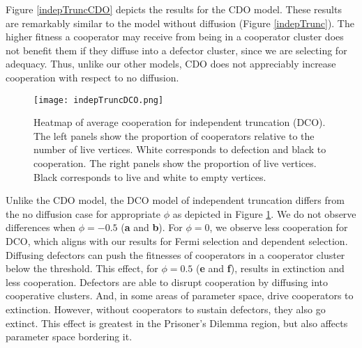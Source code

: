 \documentclass[reprint,aps,pre,twocolumn]{revtex4-1}
\begin{document}
Figure \ref{indepTruncCDO} depicts the results for the CDO model. These results are remarkably similar to the model without diffusion (Figure \ref{indepTrunc}). The higher fitness a cooperator may receive from being in a cooperator cluster does not benefit them if they diffuse into a defector cluster, since we are selecting for adequacy. Thus, unlike our other models, CDO does not appreciably increase cooperation with respect to no diffusion.



\begin{figure}
\texttt{[image: indepTruncDCO.png]}
\caption{Heatmap of average cooperation for independent truncation (DCO). The left panels show the proportion of cooperators relative to the number of live vertices. White corresponds to defection and black to cooperation. The right panels show the proportion of live vertices. Black corresponds to live and white to empty vertices.}
\label{indepTruncDCO}
\end{figure}

Unlike the CDO model, the DCO model of independent truncation differs from the no diffusion case for appropriate $\phi$ as depicted in Figure \ref{indepTruncDCO}. We do not observe differences when $\phi = -0.5$ (\textbf{a} and \textbf{b}). For $\phi = 0$, we observe less cooperation for DCO, which aligns with our results for Fermi selection and dependent selection. Diffusing defectors can push the fitnesses of cooperators in a cooperator cluster below the threshold. This effect, for $\phi = 0.5$ (\textbf{e} and \textbf{f}), results in extinction and less cooperation. Defectors are able to disrupt cooperation by diffusing into cooperative clusters. And, in some areas of parameter space, drive cooperators to extinction. However, without cooperators to sustain defectors, they also go extinct. This effect is greatest in the Prisoner's Dilemma region, but also affects parameter space bordering it.
\end{document}
